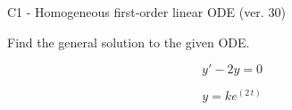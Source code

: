 \begin{exercise}
  \begin{exerciseTitle}C1 - Homogeneous first-order linear ODE (ver. 30)\end{exerciseTitle}
  \begin{exerciseStatement}
    
Find the general solution to the given ODE.

    
\[y'-2y=0\]

  \end{exerciseStatement}
  \begin{exerciseAnswer}
    
\[y= k e^{\left(2 \, t\right)}\]

  \end{exerciseAnswer}
\end{exercise}